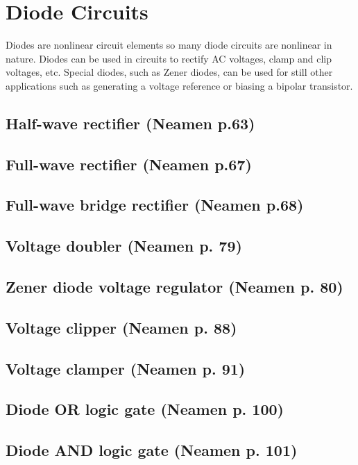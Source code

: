 \chapter{Diode Circuits}

Diodes are nonlinear circuit elements so many diode circuits are nonlinear in nature. Diodes can be used in circuits to rectify AC voltages, clamp and clip voltages, etc. Special diodes, such as Zener diodes, can be used for still other applications such as generating a voltage reference or biasing a bipolar transistor.

\section{Half-wave rectifier (Neamen p.63)}
\section{Full-wave rectifier (Neamen p.67)}

\section{Full-wave bridge rectifier (Neamen p.68)}
\section{Voltage doubler (Neamen p. 79)}

\section{Zener diode voltage regulator (Neamen p. 80)}

\section{Voltage clipper (Neamen p. 88)}
\section{Voltage clamper (Neamen p. 91)}

\section{Diode OR logic gate (Neamen p. 100)}

\section{Diode AND logic gate (Neamen p. 101)}